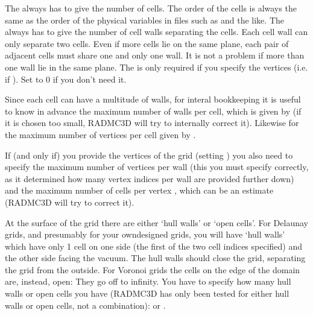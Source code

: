 \documentclass[letterpaper,10pt,english]{sphinxmanual}
\begin{document}
The  always has to give the number of cells. The order of the cells is
always the same as the order of the physical variables in files such as
 and the like.  The  always has to give the number
of cell walls separating the cells. Each cell wall can only separate two
cells. Even if more cells lie on the same plane, each pair of adjacent cells
must share one and only one wall. It is not a problem if more than one wall lie
in the same plane. The  is only required if you specify the vertices
(i.e. if ). Set to 0 if you don’t need it.

Since each cell can have a multitude of walls, for interal bookkeeping it is
useful to know in advance the maximum number of walls per cell, which is given
by  (if it is chosen too small, RADMC\sphinxhyphen{}3D will try to
internally correct it). Likewise for the maximum number of vertices per cell
given by .

If (and only if) you provide the vertices of the grid (setting
) you also need to specify the maximum number of
vertices per wall  (this you must specify correctly,
as it determined how many vertex indices per wall are provided further down)
and the maximum number of cells per vertex , which can
be an estimate (RADMC\sphinxhyphen{}3D will try to correct it).

At the surface of the grid there are either ‘hull walls’ or ‘open cells’.  For
Delaunay grids, and presumably for your own\sphinxhyphen{}designed grids, you will have ‘hull
walls’ which have only 1 cell on one side (the first of the two cell indices
specified) and the other side facing the vacuum. The hull walls should close the
grid, separating the grid from the outside.  For Voronoi grids the cells on the
edge of the domain are, instead, open: They go off to infinity. You have to
specify how many hull walls or open cells you have (RADMC\sphinxhyphen{}3D has only been
tested for either hull walls or open cells, not a combination): 
or .
\end{document}
